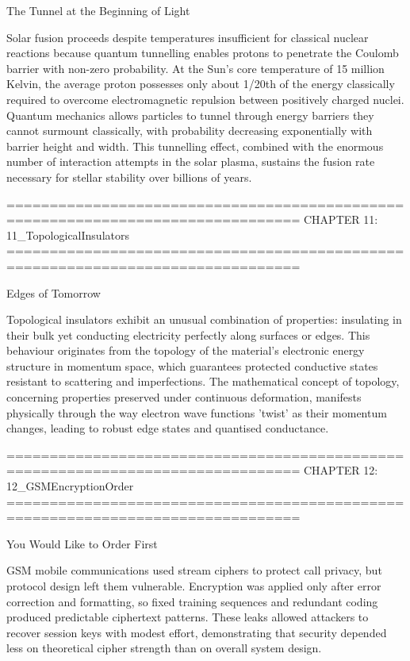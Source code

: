 The Tunnel at the Beginning of Light

Solar fusion proceeds despite temperatures insufficient for classical nuclear reactions because quantum tunnelling enables protons to penetrate the Coulomb barrier with non-zero probability. At the Sun's core temperature of 15 million Kelvin, the average proton possesses only about 1/20th of the energy classically required to overcome electromagnetic repulsion between positively charged nuclei. Quantum mechanics allows particles to \QSOpen{}tunnel\QSClose{} through energy barriers they cannot surmount classically, with probability decreasing exponentially with barrier height and width. This tunnelling effect, combined with the enormous number of interaction attempts in the solar plasma, sustains the fusion rate necessary for stellar stability over billions of years.


================================================================================
CHAPTER 11: 11_TopologicalInsulators
================================================================================

Edges of Tomorrow

Topological insulators exhibit an unusual combination of properties: insulating in their bulk yet conducting electricity perfectly along surfaces or edges. This behaviour originates from the topology of the material's electronic energy structure in momentum space, which guarantees protected conductive states resistant to scattering and imperfections. The mathematical concept of topology, concerning properties preserved under continuous deformation, manifests physically through the way electron wave functions 'twist' as their momentum changes, leading to robust edge states and quantised conductance.


================================================================================
CHAPTER 12: 12_GSMEncryptionOrder
================================================================================

You Would Like to Order First

GSM mobile communications used stream ciphers to protect call privacy, but protocol design left them vulnerable. Encryption was applied only after error correction and formatting, so fixed training sequences and redundant coding produced predictable ciphertext patterns. These leaks allowed attackers to recover session keys with modest effort, demonstrating that security depended less on theoretical cipher strength than on overall system design.


